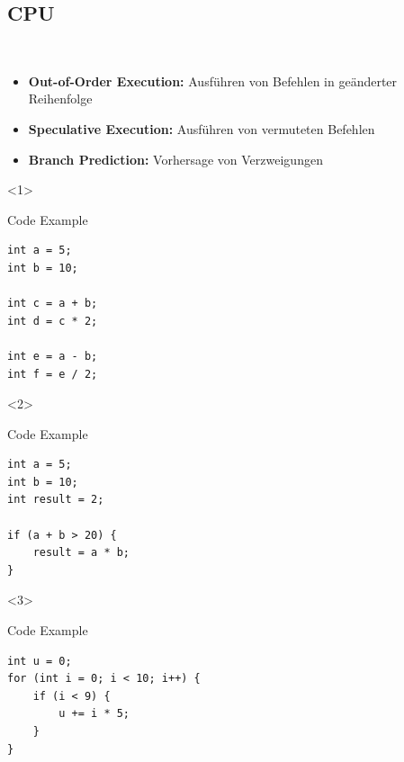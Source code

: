 \documentclass[aspectratio=1210]{beamer}
\begin{document}
\subsection{CPU}
\begin{frame}[fragile]{\insertsection\\\insertsubsection}
	\begin{itemize}
		\item<1-> \textbf{Out-of-Order Execution:} Ausführen von Befehlen in geänderter Reihenfolge
		\item<2-> \textbf{Speculative Execution:} Ausführen von vermuteten Befehlen
		\item<3-> \textbf{Branch Prediction:} Vorhersage von Verzweigungen
	\end{itemize}

	\begin{center}
		\begin{onlyenv}<1>
			\begin{minipage}{0.3\textwidth}
				\begin{block}{Code Example}
					\begin{verbatim}
int a = 5;
int b = 10;

int c = a + b;
int d = c * 2;

int e = a - b;
int f = e / 2;
                    \end{verbatim}
				\end{block}
			\end{minipage}
		\end{onlyenv}

		\begin{onlyenv}<2>
			\begin{minipage}{0.4\textwidth}
				\begin{block}{Code Example}
					\begin{verbatim}
int a = 5;
int b = 10;
int result = 2;

if (a + b > 20) {
    result = a * b;
}
                    \end{verbatim}
				\end{block}
			\end{minipage}
		\end{onlyenv}

		\begin{onlyenv}<3>
			\begin{minipage}{0.6\textwidth}
				\begin{block}{Code Example}
					\begin{verbatim}
int u = 0;
for (int i = 0; i < 10; i++) {
    if (i < 9) {
        u += i * 5;
    }
}
                    \end{verbatim}
				\end{block}
			\end{minipage}
		\end{onlyenv}
	\end{center}
\end{frame}
\end{document}
